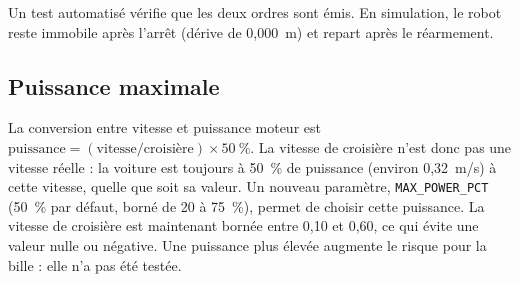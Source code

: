 Un test automatisé vérifie que les deux ordres sont émis.
En simulation, le robot reste immobile après l'arrêt (dérive de 0,000~m) et repart après le réarmement.

\subsection{Puissance maximale}
La conversion entre vitesse et puissance moteur est $\text{puissance} = (\text{vitesse} / \text{croisière}) \times 50~\%$.
La vitesse de croisière n'est donc pas une vitesse réelle : la voiture est toujours à 50~\% de puissance (environ 0,32~m/s) à cette vitesse, quelle que soit sa valeur.
Un nouveau paramètre, \texttt{MAX\_POWER\_PCT} (50~\% par défaut, borné de 20 à 75~\%), permet de choisir cette puissance.
La vitesse de croisière est maintenant bornée entre 0,10 et 0,60, ce qui évite une valeur nulle ou négative.
Une puissance plus élevée augmente le risque pour la bille : elle n'a pas été testée.
